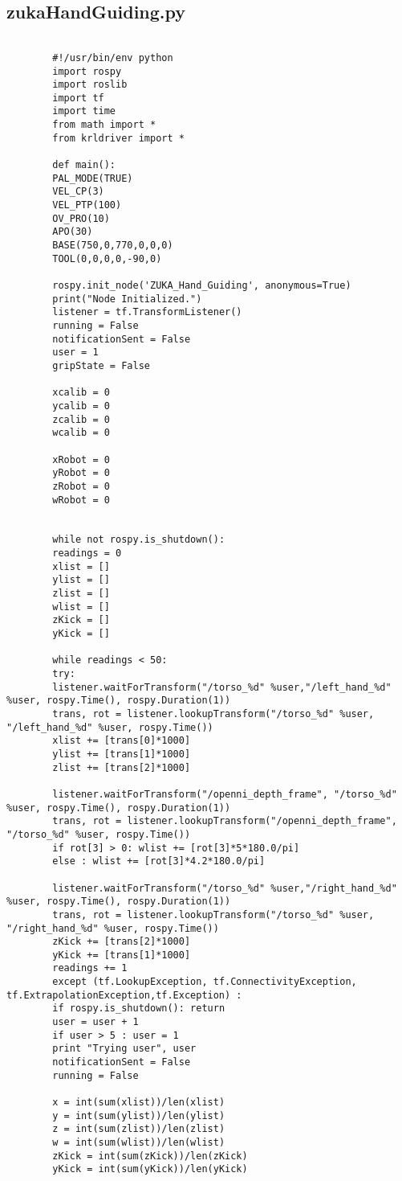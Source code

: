 \documentclass{book}
\begin{document}
	\subsection{zukaHandGuiding.py}
	\begin{verbatim}
	
		#!/usr/bin/env python
		import rospy
		import roslib
		import tf
		import time
		from math import *
		from krldriver import *
		
		def main():	
		PAL_MODE(TRUE)
		VEL_CP(3)
		VEL_PTP(100)
		OV_PRO(10)
		APO(30)
		BASE(750,0,770,0,0,0)
		TOOL(0,0,0,0,-90,0) 	
		
		rospy.init_node('ZUKA_Hand_Guiding', anonymous=True)
		print("Node Initialized.")
		listener = tf.TransformListener()
		running = False
		notificationSent = False
		user = 1
		gripState = False
		
		xcalib = 0
		ycalib = 0
		zcalib = 0
		wcalib = 0
		
		xRobot = 0
		yRobot = 0
		zRobot = 0
		wRobot = 0
		
		
		while not rospy.is_shutdown():
		readings = 0
		xlist = []
		ylist = []
		zlist = []
		wlist = []
		zKick = []
		yKick = []
		
		while readings < 50:
		try:	
		listener.waitForTransform("/torso_%d" %user,"/left_hand_%d" %user, rospy.Time(), rospy.Duration(1))
		trans, rot = listener.lookupTransform("/torso_%d" %user, "/left_hand_%d" %user, rospy.Time())
		xlist += [trans[0]*1000]
		ylist += [trans[1]*1000]
		zlist += [trans[2]*1000]
		
		listener.waitForTransform("/openni_depth_frame", "/torso_%d" %user, rospy.Time(), rospy.Duration(1))
		trans, rot = listener.lookupTransform("/openni_depth_frame", "/torso_%d" %user, rospy.Time())
		if rot[3] > 0: wlist += [rot[3]*5*180.0/pi]
		else : wlist += [rot[3]*4.2*180.0/pi]
		
		listener.waitForTransform("/torso_%d" %user,"/right_hand_%d" %user, rospy.Time(), rospy.Duration(1))
		trans, rot = listener.lookupTransform("/torso_%d" %user, "/right_hand_%d" %user, rospy.Time())
		zKick += [trans[2]*1000]
		yKick += [trans[1]*1000]
		readings += 1
		except (tf.LookupException, tf.ConnectivityException, tf.ExtrapolationException,tf.Exception) :
		if rospy.is_shutdown(): return
		user = user + 1
		if user > 5 : user = 1
		print "Trying user", user
		notificationSent = False
		running = False
		
		x = int(sum(xlist))/len(xlist)
		y = int(sum(ylist))/len(ylist)
		z = int(sum(zlist))/len(zlist)
		w = int(sum(wlist))/len(wlist)
		zKick = int(sum(zKick))/len(zKick)
		yKick = int(sum(yKick))/len(yKick)
		

\end{verbatim}
\end{document}
